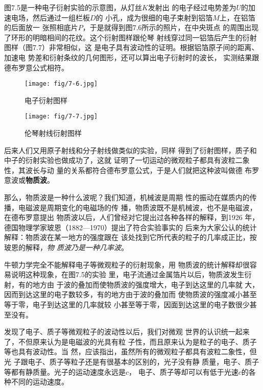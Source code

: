 图7.5是一种电子衍射实验的示意图，从灯丝$K$发射出
的电子经过电势差为$U$的加速电场，然后通过一组栏板$D$的
小孔，成为很细的电子束射到铝箔$M$上，在铝箔的后面放一
张照相底片$P$，于是就得到图7.6所示的照片，在中央斑点
的周围出现了环形的明暗相间的花纹。这个衍射图样跟伦琴
射线穿过同一铝箔后产生的衍射图样（图7.7）非常相似，这
是电子具有波动性的证明。根据铝箔原子间的距离、加速电
势差和衍射条纹的几何图形，还可以算出电子衍射时的波长，
实测结果跟德布罗意公式相符。
\begin{figure}[htp]
    \centering
    \begin{minipage}[t]{0.48\textwidth}
    \centering
    \texttt{[image: fig/7-6.jpg]}
    \caption{电子衍射图样}
    \end{minipage}
    \begin{minipage}[t]{0.48\textwidth}
    \centering
    \texttt{[image: fig/7-7.jpg]}
    \caption{伦琴射线衍射图样}
    \end{minipage}
    \end{figure}


后来人们又用原子射线和分子射线做类似的实验，同样
得到了衍射图样，质子和中子的衍射实验也做成功了，这就
证明了一切运动的微观粒子都具有波粒二象性，其波长与动
量的关系都符合德布罗意公式，于是人们就把这种波叫做德
布罗意波或\textbf{物质波}。

那么，物质波是一种什么波呢？我们知道，机械波是周期
性的振动在媒质内的传播，电磁波是周期变化的电磁场的传
播，物质波既不是机械波，也不是电磁波，在德布罗意提出
物质波以后，人们曾经对它提出过各种各样的解释，到1926
年，德国物理学家玻恩（1882—1970）提出了符合实验事实的
后来为大家公认的统计解释：物质波在某一地方的强度跟在
该处找到它所代表的粒子的几率成正比，按玻恩的解释，\textit{物
质波乃是一种几率波}。

牛顿力学完全不能解释电子等微观粒子的衍射现象，用
物质波的统计解释却很容易说明这种现象，在图7.5的实验
里，电子流通过金属箔片以后，物质波发生衍射，有的地方由
于波的叠加而使物质波的强度增大，电子到达这里的几率就
大，因而到达这里的电子数较多，有的地方由于波的叠加而
使物质波的强度减小甚至等于零，电子到达这里的几率就较
小甚至等于零，因面到达这里的电子数很少甚至没有。

发现了电子、质子等微观粒子的波动性以后，我们对微观
世界的认识统一起来了，不但原来认为是电磁波的光具有粒
子性，而且原来认为是粒子的电子、质子等也具有波动性。当
然，应该指出，虽然所有的微观粒子都具有波粒二象性，但光
子跟电子、质子等粒子还是有很基本的区别的，光子没有静
质量，电子、质子等都有静质量。光子的运动速度永远是$c$，
电子、质子等却可以有低于光速$c$的各种不同的运动速度。

